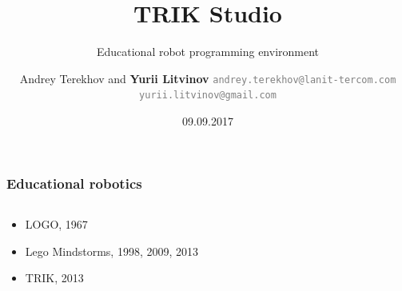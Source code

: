 \documentclass[xetex,mathserif,serif]{beamer}
\title{TRIK Studio}
\subtitle{Educational robot programming environment}
\author[Yurii Litvinov]{Andrey Terekhov and \textbf{Yurii Litvinov} \newline \textcolor{gray}{\small\texttt{andrey.terekhov@lanit-tercom.com}} \newline \textcolor{gray}{\small\texttt{yurii.litvinov@gmail.com}}}
\date{09.09.2017}
\begin{document}
	
	\frame{\titlepage}
	
	\begin{frame}
		\frametitle{Educational robotics}
		\begin{columns}
			\begin{column}{0.5\textwidth}
				\begin{itemize}
					\item LOGO, 1967
					\item Lego Mindstorms, 1998, 2009, 2013
					\item TRIK, 2013
				\end{itemize}
			\end{column}
			\begin{column}{0.5\textwidth}
			\end{column}
		\end{columns}
		\vspace{0.7cm}
	\end{frame}
\end{document}
